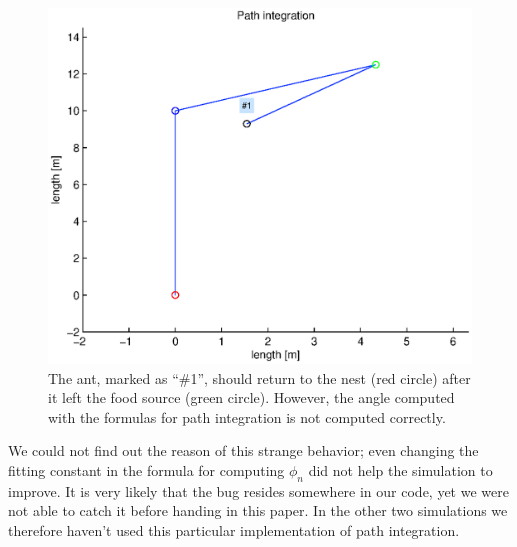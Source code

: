 \documentclass[11pt]{article}
\begin{document}
\begin{figure}[h!]
	\centering
	\includegraphics[width=.8\textwidth]{../sources/results/pathIntegrationResults/animation.eps}
	\caption{The ant, marked as ``\#1'', should return to the nest (red circle) after it left the food source (green circle). However, the angle computed with the formulas for path integration is not computed correctly.}
\end{figure}

We could not find out the reason of this strange behavior; even changing the fitting constant in the formula for computing $\phi_n$ did not help the simulation to improve. It is very likely that the bug resides somewhere in our code, yet we were not able to catch it before handing in this paper. In the other two simulations we therefore haven't used this particular implementation of path integration.
\end{document}
